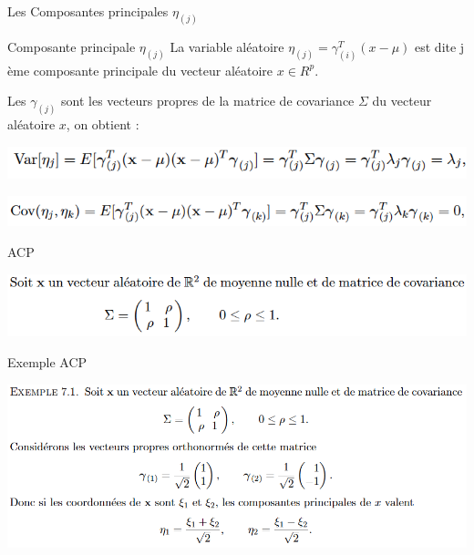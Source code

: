 \documentclass[10pt]{beamer}
\begin{document}
\begin{frame}{Les Composantes principales $\eta_{(j)}$ }

\begin{block}{Composante principale $\eta_{(j)}$}
La variable aléatoire $\eta_{(j)} = \gamma_{(i)}^T(x-\mu) $ est dite j ème composante principale du vecteur aléatoire $x \in R^p$.
\end{block}


Les $\gamma_{(j)}$ sont les vecteurs propres de la matrice
de covariance $\Sigma$  du vecteur aléatoire $x$, on obtient : 


\includegraphics[scale=0.5]{VarEtaj.png}


\includegraphics[scale=0.45]{CovEtaj.png}



\end{frame}


\begin{frame}{ ACP}

\includegraphics[scale=0.35]{ex1.png}

\end{frame}


\begin{frame}{Exemple ACP }

\includegraphics[scale=0.39]{ex.png}

\end{frame}
\end{document}
